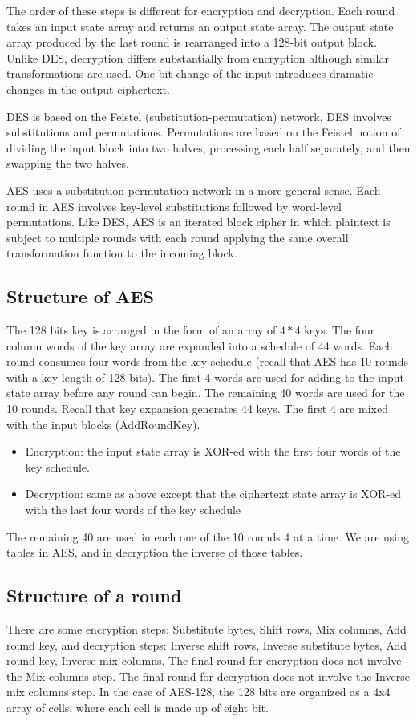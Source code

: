 The order of these steps is different for encryption and decryption. Each round takes an input state array and returns an output state array. The output state array produced by the last round is rearranged into a 128-bit output block.
Unlike DES, decryption differs substantially from encryption although similar transformations are used. One bit change of the input introduces dramatic changes in the output ciphertext.

DES is based on the Feistel (substitution-permutation) network. DES involves substitutions and permutations. Permutations are based on the Feistel notion of dividing the input block into two halves, processing each half separately, and then swapping the two halves.

AES uses a substitution-permutation network in a more general sense. Each round in AES involves key-level substitutions followed by word-level permutations. Like DES, AES is an iterated block cipher in which plaintext is subject to multiple rounds with each round applying the same overall transformation function to the incoming block.

\subsection{Structure of AES}

The 128 bits key is arranged in the form of an array of $4 * 4$ keys. The four column words of the key array are expanded into a schedule of 44 words.  Each round consumes four words from the key schedule (recall that AES has 10 rounds with a key length of 128 bits). The first 4 words are used for adding to the input state array before any round can begin. The remaining 40 words are used for the 10 rounds.
Recall that key expansion generates 44 keys. The first 4 are mixed with the input blocks (AddRoundKey).
\begin{itemize}
	\item Encryption: the input state array is XOR-ed with the first four words of the key schedule.
	\item Decryption: same as above except that the ciphertext state array is XOR-ed with the last four words of the key schedule
\end{itemize}
The remaining 40 are used in each one of the 10 rounds 4 at a time. We are using tables in AES, and in decryption the inverse of those tables.

\subsection{Structure of a round}
There are some encryption steps: Substitute bytes, Shift rows, Mix columns, Add round key, and decryption steps: Inverse shift rows, Inverse substitute bytes, Add round key, Inverse mix columns. The final round for encryption does not involve the Mix columns step. The final round for decryption does not involve the Inverse mix columns step.
In the case of AES-128, the 128 bits are organized as a $4$x$4$ array of cells, where each cell is made up of eight bit.

